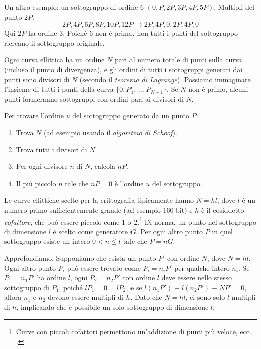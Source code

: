 Un altro esempio: un sottogruppo di ordine 6 \((0, P, 2P, 3P, 4P, 5P)\). Multipli del punto \(2P\):\vspace{.175cm}
\[2P, 4P, 6P, 8P, 10P, 12P \rightarrow 2P, 4P, 0, 2P, 4P, 0\]
Qui \(2P\) ha ordine 3. Poiché 6 non è primo, non tutti i punti del sottogruppo ricreano il sottogruppo originale.

Ogni curva ellittica ha un ordine \(N\) pari al numero totale di punti sulla curva (incluso il punto di divergenza), e gli ordini di tutti i sottogruppi generati dai punti sono divisori di \(N\) (secondo il {\em teorema di Lagrange}). Possiamo immaginare l’insieme di tutti i punti della curva \(\{0,P_1,...,P_{N-1}\}\). Se \(N\) non è primo, alcuni punti formeranno sottogruppi con ordini pari ai divisori di \(N\).

Per trovare l’ordine \(u\) del sottogruppo generato da un punto \(P\):
\begin{enumerate}
    \item Trova \(N\) (ad esempio usando il {\em algoritmo di Schoof}).
    \item Trova tutti i divisori di \(N\).
    \item Per ogni divisore \(n\) di \(N\), calcola \(n P\).
    \item Il più piccolo \(n\) tale che \(n P = 0\) è l’ordine \(u\) del sottogruppo.
\end{enumerate}

Le curve ellittiche scelte per la crittografia tipicamente hanno \(N = h l\), dove \(l\) è un numero primo sufficientemente grande (ad esempio 160 bit) e \(h\) è il cosiddetto {\em cofattore}, che può essere piccolo come 1 o 2.\footnote{Curve con piccoli cofattori permettono un’addizione di punti più veloce, ecc. \cite{Bernstein2008}.} Di norma, un punto nel sottogruppo di dimensione \(l\) è scelto come generatore \(G\). Per ogni altro punto \(P\) in quel sottogruppo esiste un intero \(0 < n \leq l\) tale che \(P = n G\).

Approfondiamo. Supponiamo che esista un punto \(P'\) con ordine \(N\), dove \(N = h l\). Ogni altro punto \(P_i\) può essere trovato come \(P_i = n_i P'\) per qualche intero \(n_i\). Se \(P_1 = n_1 P'\) ha ordine \(l\), ogni \(P_2 = n_2 P'\) con ordine \(l\) deve essere nello stesso sottogruppo di \(P_1\), poiché \(l P_1 = 0 = l P_2\), e se \(l(n_1 P') \equiv l(n_2 P') \equiv N P' = 0\), allora \(n_1\) e \(n_2\) devono essere multipli di \(h\). Dato che \(N = h l\), ci sono solo \(l\) multipli di \(h\), implicando che è possibile un solo sottogruppo di dimensione \(l\).

